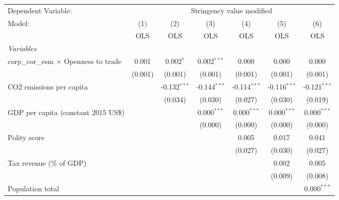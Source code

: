 
\begingroup
\centering
\begin{tabular}{lcccccc}
   \toprule
   Dependent Variable: & \multicolumn{6}{c}{Stringency value modified}\\
   Model:                                       & (1)     & (2)            & (3)            & (4)            & (5)            & (6)\\  
                                                &  OLS    & OLS            & OLS            & OLS            & OLS            & OLS\\  
   \midrule
   \emph{Variables}\\
   corp\_cor\_esm $\times$ Openness to trade    & 0.001   & 0.002$^{*}$    & 0.002$^{***}$  & 0.000          & 0.000          & 0.000\\   
                                                & (0.001) & (0.001)        & (0.001)        & (0.001)        & (0.001)        & (0.001)\\   
   CO2 emissions per capita                     &         & -0.132$^{***}$ & -0.144$^{***}$ & -0.114$^{***}$ & -0.116$^{***}$ & -0.121$^{***}$\\   
                                                &         & (0.034)        & (0.030)        & (0.027)        & (0.030)        & (0.019)\\   
   GDP per capita (constant 2015 US\$)          &         &                & 0.000$^{***}$  & 0.000$^{***}$  & 0.000$^{***}$  & 0.000$^{***}$\\   
                                                &         &                & (0.000)        & (0.000)        & (0.000)        & (0.000)\\   
   Polity score                                 &         &                &                & 0.005          & 0.017          & 0.041\\   
                                                &         &                &                & (0.027)        & (0.030)        & (0.027)\\   
   Tax revenue (\% of GDP)                      &         &                &                &                & 0.002          & 0.005\\   
                                                &         &                &                &                & (0.009)        & (0.008)\\   
   Population total                             &         &                &                &                &                & 0.000$^{***}$\\   

\end{tabular}
